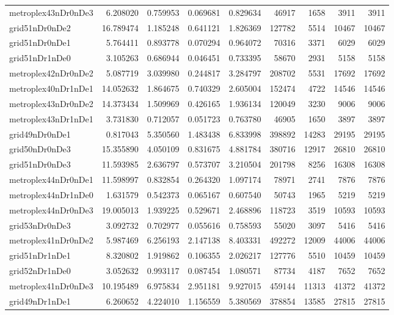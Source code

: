 \begin{longtable}{|l|r|r|r|r|r|r|r|r|}
metroplex43nDr0nDe3 & 6.208020 & 0.759953 & 0.069681 & 0.829634 & 46917 & 1658 & 3911 & 3911 \\
grid51nDr0nDe2 & 16.789474 & 1.185248 & 0.641121 & 1.826369 & 127782 & 5514 & 10467 & 10467 \\
grid51nDr0nDe1 & 5.764411 & 0.893778 & 0.070294 & 0.964072 & 70316 & 3371 & 6029 & 6029 \\
grid51nDr1nDe0 & 3.105263 & 0.686944 & 0.046451 & 0.733395 & 58670 & 2931 & 5158 & 5158 \\
metroplex42nDr0nDe2 & 5.087719 & 3.039980 & 0.244817 & 3.284797 & 208702 & 5531 & 17692 & 17692 \\
metroplex40nDr1nDe1 & 14.052632 & 1.864675 & 0.740329 & 2.605004 & 152474 & 4722 & 14546 & 14546 \\
metroplex43nDr0nDe2 & 14.373434 & 1.509969 & 0.426165 & 1.936134 & 120049 & 3230 & 9006 & 9006 \\
metroplex43nDr1nDe1 & 3.731830 & 0.712057 & 0.051723 & 0.763780 & 46905 & 1650 & 3897 & 3897 \\
grid49nDr0nDe1 & 0.817043 & 5.350560 & 1.483438 & 6.833998 & 398892 & 14283 & 29195 & 29195 \\
grid50nDr0nDe3 & 15.355890 & 4.050109 & 0.831675 & 4.881784 & 380716 & 12917 & 26810 & 26810 \\
grid51nDr0nDe3 & 11.593985 & 2.636797 & 0.573707 & 3.210504 & 201798 & 8256 & 16308 & 16308 \\
metroplex44nDr0nDe1 & 11.598997 & 0.832854 & 0.264320 & 1.097174 & 78971 & 2741 & 7876 & 7876 \\
metroplex44nDr1nDe0 & 1.631579 & 0.542373 & 0.065167 & 0.607540 & 50743 & 1965 & 5219 & 5219 \\
metroplex44nDr0nDe3 & 19.005013 & 1.939225 & 0.529671 & 2.468896 & 118723 & 3519 & 10593 & 10593 \\
grid53nDr0nDe3 & 3.092732 & 0.702977 & 0.055616 & 0.758593 & 55020 & 3097 & 5416 & 5416 \\
metroplex41nDr0nDe2 & 5.987469 & 6.256193 & 2.147138 & 8.403331 & 492272 & 12009 & 44006 & 44006 \\
grid51nDr1nDe1 & 8.320802 & 1.919862 & 0.106355 & 2.026217 & 127776 & 5510 & 10459 & 10459 \\
grid52nDr1nDe0 & 3.052632 & 0.993117 & 0.087454 & 1.080571 & 87734 & 4187 & 7652 & 7652 \\
metroplex41nDr0nDe3 & 10.195489 & 6.975834 & 2.951181 & 9.927015 & 459144 & 11313 & 41372 & 41372 \\
grid49nDr1nDe1 & 6.260652 & 4.224010 & 1.156559 & 5.380569 & 378854 & 13585 & 27815 & 27815 \\

\end{longtable}
